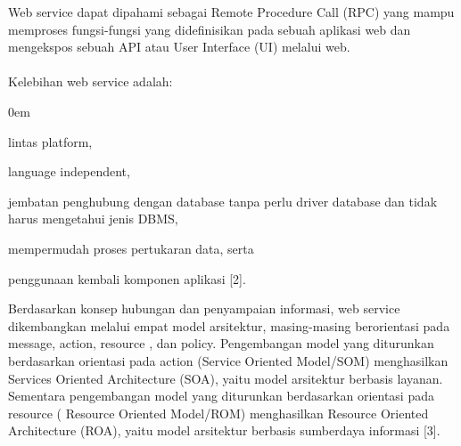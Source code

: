 \documentclass{jtetiproposalskripsi}
\begin{document}
Web service dapat dipahami sebagai Remote Procedure Call  (RPC) yang mampu memproses fungsi-fungsi yang didefinisikan pada sebuah aplikasi  web dan mengekspos sebuah API atau  User Interface (UI) melalui web. 
\\
\\
Kelebihan web service  adalah:
\vspace{-0.5cm}
\begin{enumerate}[a.]
\begin{singlespace}
\itemsep0em
\item lintas  platform,
\item language independent,
\item jembatan penghubung dengan database  tanpa perlu  driver database dan tidak harus mengetahui jenis DBMS,
\item mempermudah proses pertukaran data, serta
\item penggunaan kembali komponen aplikasi  [2].
\end{singlespace}
\end{enumerate} 

Berdasarkan konsep hubungan dan penyampaian informasi, web service  dikembangkan melalui empat model arsitektur, masing-masing berorientasi pada  message,  action,  resource , dan policy. Pengembangan model yang diturunkan berdasarkan orientasi pada action (Service Oriented Model/SOM) menghasilkan  Services Oriented Architecture  (SOA), yaitu model arsitektur berbasis layanan. Sementara pengembangan model yang diturunkan berdasarkan orientasi pada  resource  ( Resource Oriented Model/ROM) menghasilkan Resource Oriented Architecture (ROA), yaitu model arsitektur berbasis sumberdaya informasi  [3].  
\end{document}
